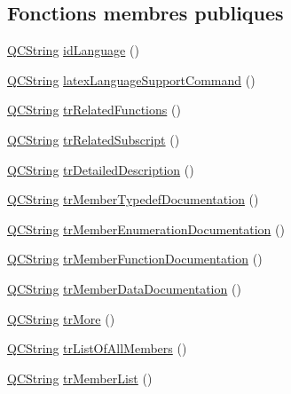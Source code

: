 \subsection*{Fonctions membres publiques}
\begin{DoxyCompactItemize}
\item 
\hyperlink{class_q_c_string}{Q\+C\+String} \hyperlink{class_translator_slovene_a5710eb456d050b1cf3b9053209e358c5}{id\+Language} ()
\item 
\hyperlink{class_q_c_string}{Q\+C\+String} \hyperlink{class_translator_slovene_a8c1f38606d2f5bbc776ddaeba44539dc}{latex\+Language\+Support\+Command} ()
\item 
\hyperlink{class_q_c_string}{Q\+C\+String} \hyperlink{class_translator_slovene_a6b1b555bbca8b84fdfed13c04e23c5a2}{tr\+Related\+Functions} ()
\item 
\hyperlink{class_q_c_string}{Q\+C\+String} \hyperlink{class_translator_slovene_ad67dd47528ff8b68f5a990bef893c040}{tr\+Related\+Subscript} ()
\item 
\hyperlink{class_q_c_string}{Q\+C\+String} \hyperlink{class_translator_slovene_a630618724967bd7b1da822f2bbd3142e}{tr\+Detailed\+Description} ()
\item 
\hyperlink{class_q_c_string}{Q\+C\+String} \hyperlink{class_translator_slovene_a84a2f96682a5e4b6d7054716771f6151}{tr\+Member\+Typedef\+Documentation} ()
\item 
\hyperlink{class_q_c_string}{Q\+C\+String} \hyperlink{class_translator_slovene_a244760bf3721fd5b1519caab95d9f268}{tr\+Member\+Enumeration\+Documentation} ()
\item 
\hyperlink{class_q_c_string}{Q\+C\+String} \hyperlink{class_translator_slovene_aa1aebd43e999f38b353c964f8bf329cb}{tr\+Member\+Function\+Documentation} ()
\item 
\hyperlink{class_q_c_string}{Q\+C\+String} \hyperlink{class_translator_slovene_a7adcc9408f259dc4dea9d15001e5136c}{tr\+Member\+Data\+Documentation} ()
\item 
\hyperlink{class_q_c_string}{Q\+C\+String} \hyperlink{class_translator_slovene_a9387f6c7ee3a4980de8db7fc99b3dc89}{tr\+More} ()
\item 
\hyperlink{class_q_c_string}{Q\+C\+String} \hyperlink{class_translator_slovene_aca1ad0f3927f4e05992cfdbe4ea5a36b}{tr\+List\+Of\+All\+Members} ()
\item 
\hyperlink{class_q_c_string}{Q\+C\+String} \hyperlink{class_translator_slovene_a0c28bdd82a363bae1ea57736e2571001}{tr\+Member\+List} ()
\item 

\end{DoxyCompactItemize}
